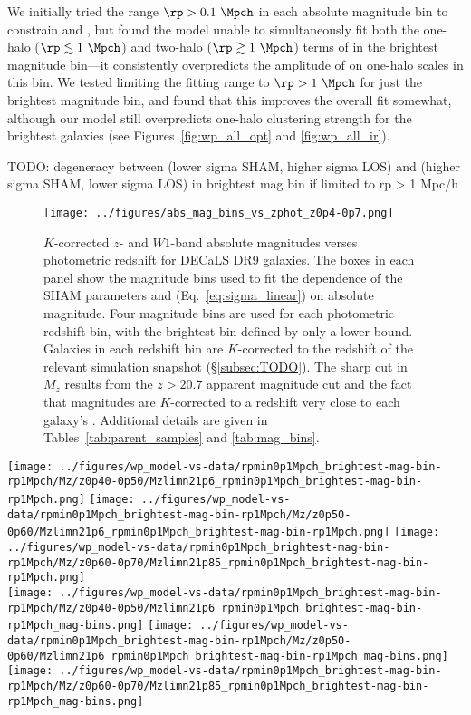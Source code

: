 \documentclass[twocolumn,apj,iop,tighten]{emulateapj2}
\begin{document}
We initially tried the range $\rp>0.1~\Mpch$ in each absolute magnitude bin to constrain \sigmamag and \sigmalos, but found the model unable to simultaneously fit both the one-halo ($\rp \lesssim 1\ \Mpch$) and two-halo ($\rp \gtrsim 1\ \Mpch$) terms of \wprp in the brightest magnitude bin---it consistently overpredicts the amplitude of \wprp on one-halo scales in this bin. We tested limiting the fitting range to $\rp > 1\ \Mpch$ for just the brightest magnitude bin, and found that this improves the overall fit somewhat, although our model still overpredicts one-halo clustering strength for the brightest galaxies (see Figures~\ref{fig:wp_all_opt} and \ref{fig:wp_all_ir}).

TODO: degeneracy between (lower sigma SHAM, higher sigma LOS) and (higher sigma SHAM, lower sigma LOS) in brightest mag bin if limited to rp > 1 Mpc/h

\begin{figure}
\centering
\texttt{[image: ../figures/abs\_mag\_bins\_vs\_zphot\_z0p4-0p7.png]}
\caption{$K$-corrected $z$- and $W1$-band absolute magnitudes verses photometric redshift for DECaLS DR9 galaxies. The boxes in each panel show the magnitude bins used to fit the dependence of the SHAM parameters \sigmamag and \sigmalos (Eq.~\ref{eq:sigma_linear}) on absolute magnitude. Four magnitude bins are used for each photometric redshift bin, with the brightest bin defined by only a lower bound. Galaxies in each redshift bin are $K$-corrected to the redshift of the relevant simulation snapshot (\S\ref{subsec:TODO}). The sharp cut in $M_z$ results from the $z > 20.7$ apparent magnitude cut and the fact that magnitudes are $K$-corrected to a redshift very close to each galaxy's \zphot. Additional details are given in Tables~\ref{tab:parent_samples} and \ref{tab:mag_bins}.
}
\label{fig:zphot_mag-bins}
\end{figure}


\begin{figure*}
\centering
\texttt{[image: ../figures/wp\_model-vs-data/rpmin0p1Mpch\_brightest-mag-bin-rp1Mpch/Mz/z0p40-0p50/Mzlimn21p6\_rpmin0p1Mpch\_brightest-mag-bin-rp1Mpch.png]}
\texttt{[image: ../figures/wp\_model-vs-data/rpmin0p1Mpch\_brightest-mag-bin-rp1Mpch/Mz/z0p50-0p60/Mzlimn21p6\_rpmin0p1Mpch\_brightest-mag-bin-rp1Mpch.png]}
\texttt{[image: ../figures/wp\_model-vs-data/rpmin0p1Mpch\_brightest-mag-bin-rp1Mpch/Mz/z0p60-0p70/Mzlimn21p85\_rpmin0p1Mpch\_brightest-mag-bin-rp1Mpch.png]}
\\
\texttt{[image: ../figures/wp\_model-vs-data/rpmin0p1Mpch\_brightest-mag-bin-rp1Mpch/Mz/z0p40-0p50/Mzlimn21p6\_rpmin0p1Mpch\_brightest-mag-bin-rp1Mpch\_mag-bins.png]}
\texttt{[image: ../figures/wp\_model-vs-data/rpmin0p1Mpch\_brightest-mag-bin-rp1Mpch/Mz/z0p50-0p60/Mzlimn21p6\_rpmin0p1Mpch\_brightest-mag-bin-rp1Mpch\_mag-bins.png]}
\texttt{[image: ../figures/wp\_model-vs-data/rpmin0p1Mpch\_brightest-mag-bin-rp1Mpch/Mz/z0p60-0p70/Mzlimn21p85\_rpmin0p1Mpch\_brightest-mag-bin-rp1Mpch\_mag-bins.png]}
\caption{TODO
}
\label{fig:wp_all_opt}
\end{figure*}
\end{document}
